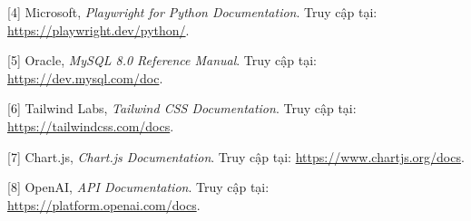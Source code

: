 \documentclass[13pt,a4paper]{extreport}
\begin{document}
[4] Microsoft, \emph{Playwright for Python Documentation}.  
Truy cập tại: \href{https://playwright.dev/python/}{https://playwright.dev/python/}.
 
[5] Oracle, \emph{MySQL 8.0 Reference Manual}.  
Truy cập tại: \href{https://dev.mysql.com/doc}{https://dev.mysql.com/doc}.
 
[6] Tailwind Labs, \emph{Tailwind CSS Documentation}.  
Truy cập tại: \href{https://tailwindcss.com/docs}{https://tailwindcss.com/docs}.
 
[7] Chart.js, \emph{Chart.js Documentation}.  
Truy cập tại: \href{https://www.chartjs.org/docs}{https://www.chartjs.org/docs}.

[8] OpenAI, \emph{API Documentation}.  
Truy cập tại: \href{https://platform.openai.com/docs}{https://platform.openai.com/docs}.
 
\end{document}
